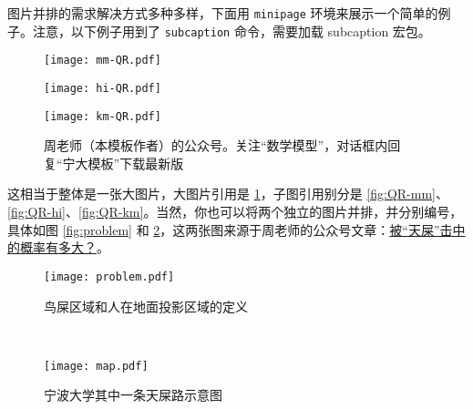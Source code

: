 图片并排的需求解决方式多种多样，下面用 \verb|minipage| 环境来展示一个简单的例子。注意，以下例子用到了 \verb|subcaption| 命令，需要加载 subcaption 宏包。
\begin{figure}[!htb]
    \centering
    \begin{minipage}[c]{0.32\textwidth}
        \centering
        \texttt{[image: mm-QR.pdf]}
        \label{fig:QR-mm}
    \end{minipage}
    \begin{minipage}[c]{0.32\textwidth}
        \centering
        \texttt{[image: hi-QR.pdf]}
        \label{fig:QR-hi}
    \end{minipage}
    \begin{minipage}[c]{0.32\textwidth}
        \centering
        \texttt{[image: km-QR.pdf]}
        \label{fig:QR-km}
    \end{minipage}
    \caption{周老师（本模板作者）的公众号。关注“数学模型”，对话框内回复“宁大模板”下载最新版}
    \label{fig:QR}
\end{figure}
这相当于整体是一张大图片，大图片引用是 \ref{fig:QR}，子图引用别分是 \ref{fig:QR-mm}、\ref{fig:QR-hi}、\ref{fig:QR-km}。当然，你也可以将两个独立的图片并排，并分别编号，具体如图 \ref{fig:problem} 和 \ref{fig:map}，这两张图来源于周老师的公众号文章：\href{https://mp.weixin.qq.com/s/uI-NiR-1rdzeKxjOOUzqlw}{被“天屎”击中的概率有多大？}\cite{nbubirds}。

\begin{figure}[!htb]
    \centering
    \begin{minipage}[c]{0.45\textwidth}
        \centering
        \texttt{[image: problem.pdf]}
        \caption{鸟屎区域和人在地面投影区域的定义}\label{fig:problem}
    \end{minipage}
    \begin{minipage}[c]{0.075\textwidth}
         ~%
    \end{minipage}
    \begin{minipage}[c]{0.45\textwidth}
        \centering
        \texttt{[image: map.pdf]}
        \caption{宁波大学其中一条天屎路示意图}
        \label{fig:map}
    \end{minipage}
\end{figure}


